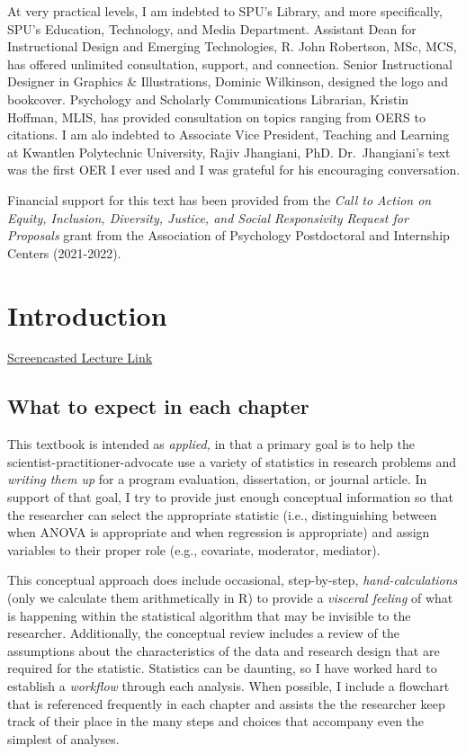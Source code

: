 \documentclass[
  english,
]{book}
\begin{document}
At very practical levels, I am indebted to SPU's Library, and more specifically, SPU's Education, Technology, and Media Department. Assistant Dean for Instructional Design and Emerging Technologies, R. John Robertson, MSc, MCS, has offered unlimited consultation, support, and connection. Senior Instructional Designer in Graphics \& Illustrations, Dominic Wilkinson, designed the logo and bookcover. Psychology and Scholarly Communications Librarian, Kristin Hoffman, MLIS, has provided consultation on topics ranging from OERS to citations. I am alo indebted to Associate Vice President, Teaching and Learning at Kwantlen Polytechnic University, Rajiv Jhangiani, PhD. Dr.~Jhangiani's text \citeyearpar{jhangiani_research_2019} was the first OER I ever used and I was grateful for his encouraging conversation.

Financial support for this text has been provided from the \emph{Call to Action on Equity, Inclusion, Diversity, Justice, and Social Responsivity
Request for Proposals} grant from the Association of Psychology Postdoctoral and Internship Centers (2021-2022).

\hypertarget{ReCintro}{%
\chapter{Introduction}\label{ReCintro}}

\href{https://spu.hosted.panopto.com/Panopto/Pages/Viewer.aspx?pid=cc9b7c0d-e5c3-4e4e-a469-acf7013ee761}{Screencasted Lecture Link}

\hypertarget{what-to-expect-in-each-chapter}{%
\section{What to expect in each chapter}\label{what-to-expect-in-each-chapter}}

This textbook is intended as \emph{applied,} in that a primary goal is to help the scientist-practitioner-advocate use a variety of statistics in research problems and \emph{writing them up} for a program evaluation, dissertation, or journal article. In support of that goal, I try to provide just enough conceptual information so that the researcher can select the appropriate statistic (i.e., distinguishing between when ANOVA is appropriate and when regression is appropriate) and assign variables to their proper role (e.g., covariate, moderator, mediator).

This conceptual approach does include occasional, step-by-step, \emph{hand-calculations} (only we calculate them arithmetically in R) to provide a \emph{visceral feeling} of what is happening within the statistical algorithm that may be invisible to the researcher. Additionally, the conceptual review includes a review of the assumptions about the characteristics of the data and research design that are required for the statistic. Statistics can be daunting, so I have worked hard to establish a \emph{workflow} through each analysis. When possible, I include a flowchart that is referenced frequently in each chapter and assists the the researcher keep track of their place in the many steps and choices that accompany even the simplest of analyses.
\end{document}
